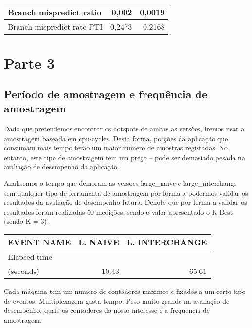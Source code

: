 \documentclass[conference,compsoc]{IEEEtran}
\begin{document}
\begin{itemize}
\begin{table}[H]
\begin{tabular}{ | l | r | r |   }
  Branch mispredict ratio	 & 0,002   &     0,0019  \\ \hline      

  
  Branch mispredict rate PTI	 &  0,2473   &   0,2168    \\ \hline          
   
     \end{tabular}
  \end{table}
  
  
  
  \section{Parte 3 }

\subsection{Período de amostragem e frequência de amostragem}
Dado que pretendemos encontrar os hotspots de ambas as versões, iremos usar a amostragem baseada em cpu-cycles. Desta forma, porções da aplicação que consumam mais tempo terão um maior número de amostras registadas. No entanto, este tipo de amostragem tem um preço -- pode ser demasiado pesada na avaliação de desempenho da aplicação. \par 
Analisemos o tempo que demoram as versões large\_naive e large\_interchange sem qualquer tipo de ferramenta de amostragem por forma a podermos validar os resultados da avaliação de desempenho futura. Denote que por forma a validar os resultados foram realizadas 50 medições, sendo o valor apresentado o K Best (sendo K = 3) :

 \begin{tabular}{ | l | r | r |   }

  \hline
  EVENT NAME	 & L. NAIVE  & L. INTERCHANGE \\ \hline 
   Elapsed time & & \\ (seconds) & 10.43 & 65.61  \\ \hline    
  \end{tabular}




Cada máquina tem um numero de contadores maximos e fixados a um certo tipo de eventos. Multiplexagem gasta tempo. 
Peso muito grande na avaliação de desempenho. quais os contadores do nosso interesse e a frequencia de amostragem. 



\end{itemize}
\end{document}
